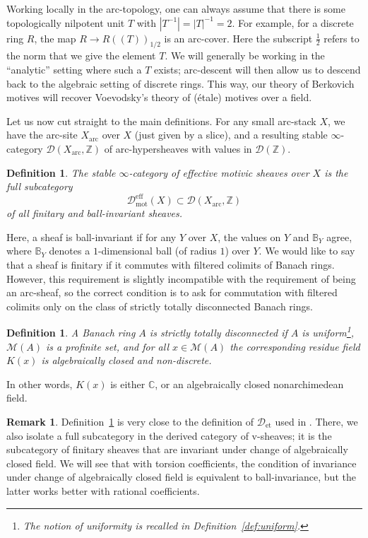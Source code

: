 \documentclass[11pt]{amsart}
\numberwithin{equation}{section}
\numberwithin{theorem}{section}
\newtheorem{definition}[theorem]{Definition}
\theoremstyle{definition}
\newtheorem{remark}[theorem]{Remark}
\begin{document}
Working locally in the arc-topology, one can always assume that there is some topologically nilpotent unit $T$ with $|T^{-1}|=|T|^{-1}=2$. For example, for a discrete ring $R$, the map $R\to R((T))_{1/2}$ is an arc-cover. Here the subscript $\tfrac 12$ refers to the norm that we give the element $T$. We will generally be working in the ``analytic'' setting where such a $T$ exists; arc-descent will then allow us to descend back to the algebraic setting of discrete rings. This way, our theory of Berkovich motives will recover Voevodsky's theory of (\'etale) motives over a field.

Let us now cut straight to the main definitions. For any small arc-stack $X$, we have the arc-site $X_{\mathrm{arc}}$ over $X$ (just given by a slice), and a resulting stable $\infty$-category $\mathcal D(X_{\mathrm{arc}},\mathbb Z)$ of arc-hypersheaves with values in $\mathcal D(\mathbb Z)$.

\begin{definition}\label{def:effectivemotivesintro} The stable $\infty$-category of effective motivic sheaves over $X$ is the full subcategory
\[
\mathcal D_{\mathrm{mot}}^{\mathrm{eff}}(X)\subset \mathcal D(X_{\mathrm{arc}},\mathbb Z)
\]
of all finitary and ball-invariant sheaves.
\end{definition}

Here, a sheaf is ball-invariant if for any $Y$ over $X$, the values on $Y$ and $\mathbb B_Y$ agree, where $\mathbb B_Y$ denotes a $1$-dimensional ball (of radius $1$) over $Y$. We would like to say that a sheaf is finitary if it commutes with filtered colimits of Banach rings. However, this requirement is slightly incompatible with the requirement of being an arc-sheaf, so the correct condition is to ask for commutation with filtered colimits only on the class of strictly totally disconnected Banach rings.

\begin{definition} A Banach ring $A$ is strictly totally disconnected if $A$ is uniform\footnote{The notion of uniformity is recalled in Definition~\ref{def:uniform}.}, $\mathcal M(A)$ is a profinite set, and for all $x\in \mathcal M(A)$ the corresponding residue field $K(x)$ is algebraically closed and non-discrete.
\end{definition}

In other words, $K(x)$ is either $\mathbb C$, or an algebraically closed nonarchimedean field.

\begin{remark} Definition~\ref{def:effectivemotivesintro} is very close to the definition of $\mathcal D_{\mathrm{et}}$ used in \cite{ECoD}. There, we also isolate a full subcategory in the derived category of v-sheaves; it is the subcategory of finitary sheaves that are invariant under change of algebraically closed field. We will see that with torsion coefficients, the condition of invariance under change of algebraically closed field is equivalent to ball-invariance, but the latter works better with rational coefficients.
\end{remark}
\end{document}
